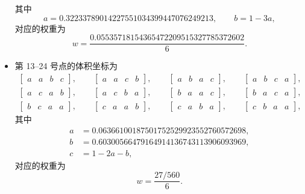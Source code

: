 \begin{itemize}[wide]
\begin{equation}
\end{equation}
其中
\begin{equation}
a=0.32233789014227551034399447076249213,\qquad b=1-3a,
\end{equation}
对应的权重为
\begin{equation}
w=\frac{0.05535718154365472209515327785372602}{6}.
\end{equation}
\item 第 13–24 号点的体积坐标为
\begin{equation}
\begin{gathered}\begin{bmatrix}a & a & b & c\end{bmatrix},\qquad\begin{bmatrix}a & a & c & b\end{bmatrix},\qquad\begin{bmatrix}a & b & a & c\end{bmatrix},\qquad\begin{bmatrix}a & b & c & a\end{bmatrix},\\
\begin{bmatrix}a & c & a & b\end{bmatrix},\qquad\begin{bmatrix}a & c & b & a\end{bmatrix},\qquad\begin{bmatrix}b & a & a & c\end{bmatrix},\qquad\begin{bmatrix}b & a & c & a\end{bmatrix},\\
\begin{bmatrix}b & c & a & a\end{bmatrix},\qquad\begin{bmatrix}c & a & a & b\end{bmatrix},\qquad\begin{bmatrix}c & a & b & a\end{bmatrix},\qquad\begin{bmatrix}c & b & a & a\end{bmatrix},
\end{gathered}
\end{equation}
其中
\begin{equation}
\begin{aligned}a & =0.06366100187501752529923552760572698,\\
b & =0.60300566479164914136743113906093969,\\
c & =1-2a-b,
\end{aligned}
\end{equation}
对应的权重为
\begin{equation}
w=\frac{27/560}{6}.
\end{equation}
\end{itemize}
%

